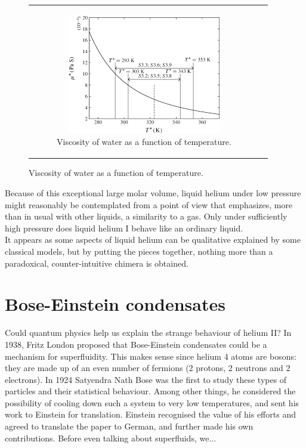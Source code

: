 \documentclass{article}
\begin{document}
\begin{figure}[H]
\begin{tabular}{cc}
\begin{subfigure}{0.5\textwidth}
            \includegraphics[width=\linewidth]{Images/waterVis.png}
            \caption{Viscosity of water as a function of temperature.}
            \label{fig:enter-label}
        \end{subfigure}
   
    \end{tabular}
\end{figure}

Because of this exceptional large molar volume, liquid helium under low pressure might reasonably be contemplated from a point of view that emphasizes, more than in usual with other liquids, a similarity to a gas. Only under sufficiently high pressure does liquid helium I behave like an ordinary liquid.
\\

It appears as some aspects of liquid helium can be qualitative explained by some classical models, but by putting the pieces together, nothing more than a paradoxical, counter-intuitive chimera is obtained. 

\section{Bose-Einstein condensates}

Could quantum physics help us explain the strange behaviour of helium II?  In 1938, Fritz London proposed that Bose-Einstein condensates could be a mechanism for superfluidity.  This makes sense since helium 4 atoms are bosons: they are made up of an even number of fermions (2 protons, 2 neutrons and 2 electrons).  In 1924 Satyendra Nath Bose was the first to study these types of particles and their statistical behaviour.  Among other things, he considered the possibility of cooling down such a system to very low temperatures, and sent his work to Einstein for translation.  Einstein recognised the value of his efforts and agreed to translate the paper to German, and further made his own contributions.
Before even talking about superfluids, we...
\end{document}
